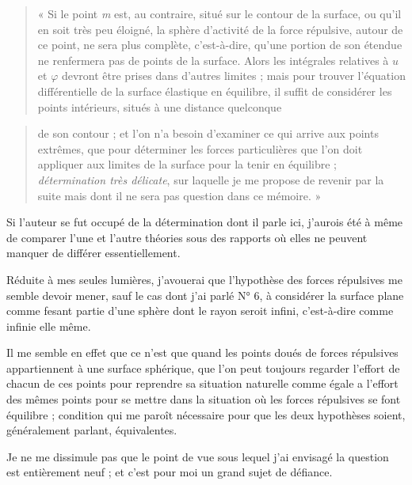 \documentclass[11pt,a4paper]{article}
\begin{document}
\begin{quote}
« Si le point \emph{m} est, au contraire, situé sur le contour de la surface,
ou qu'il en soit très peu éloigné, la sphère d'activité de la force répulsive,
autour de ce point, ne sera plus complète, c'est-à-dire, qu'une portion de son
étendue ne renfermera pas de points de la surface. Alors les intégrales
relatives à $u$ et $\varphi$ devront être prises dans d'autres limites ; mais
pour trouver l'équation différentielle de la surface élastique en équilibre,
il suffit de considérer les points intérieurs, situés à une distance
quelconque
\end{quote}

\begin{quote}
de son contour ; et l'on n'a besoin d'examiner ce qui arrive aux points
extrêmes, que pour déterminer les forces particulières que l'on doit appliquer
aux limites de la surface pour la tenir en équilibre ; \emph{détermination très
délicate}, sur laquelle je me propose de revenir par la suite mais dont il ne
sera pas question dans ce mémoire. »
\end{quote}

Si l'auteur se fut occupé de la détermination dont il parle ici, j'aurois été
à même de comparer l'une et l'autre théories sous des rapports où elles ne
peuvent manquer de différer essentiellement.

Réduite à mes seules lumières, j'avouerai que l'hypothèse des forces
répulsives me semble devoir mener, sauf le cas dont j'ai parlé N° 6, à
considérer la surface plane comme fesant partie d'une sphère dont le rayon
seroit infini, c'est-à-dire comme infinie elle même.

Il me semble en effet que ce n'est que quand les points doués de forces
répulsives appartiennent à une surface sphérique, que l'on peut toujours
regarder l'effort de chacun de ces points pour reprendre sa situation
naturelle comme égale a l'effort des mêmes points pour se mettre dans la
situation où les forces répulsives se font équilibre ; condition qui me paroît
nécessaire pour que les deux hypothèses soient, généralement parlant,
équivalentes.

Je ne me dissimule pas que le point de vue sous lequel j'ai envisagé la
question est entièrement neuf ; et c'est pour moi un grand sujet de défiance.
\end{document}
